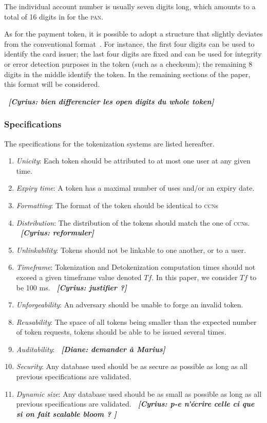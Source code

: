 \documentclass{llncs}
\newcommand{\cn}[1]{\emph{\bf \color{purple}~[Cyrius: #1]}}
\newcommand{\di}[1]{\emph{\bf \color{orange}~[Diane: #1]}}
\begin{document}
The individual account number is usually seven digits long, which amounts to a total of 16 digits in for the \textsc{pan}.

As for the payment token, it is possible to adopt a structure that slightly deviates from the conventional format~\cite{PCI-Guidelines}. For instance, the first four digits can be used to identify the card issuer; the last four digits are fixed and can be used for integrity or error detection purposes in the token (such as a checksum); the remaining 8 digits in the middle identify the token. In the remaining sections of the paper, this format will be considered.

\cn{bien differencier les open digits du whole token}

\subsubsection{Specifications}
The specifications for the tokenization systems are listed hereafter.
\begin{enumerate}
    \item \label{item-spec-disting} \textit{Unicity}: Each token should be attributed to at most one user at any given time.
    \item \textit{Expiry time}: A token has a maximal number of uses and/or an expiry date.
    \item \label{item-spec-format-ccn} \textit{Formatting}: The format of the token should be identical to \textsc{ccn}s 
    \item \textit{Distribution}: The distribution of the tokens should match the one of \textsc{ccn}s. \cn{reformuler}
    \item \label{item-spec-linkable} \textit{Unlinkability}: Tokens should not be linkable to one another, or to a user.
    \item \label{item-spec-time} \textit{Timeframe}: Tokenization and Detokenization computation times should not exceed a given timeframe value denoted $Tf$. In this paper, we consider $Tf$ to be 100 ms. \cn{justifier ?}
    \item \label{item-spec-unforgeability}\textit{Unforgeability}: An adversary should be unable to forge an invalid token.
    \item \label{item-sper-reusablilty}\textit{Reusability}: The space of all tokens being smaller than the expected number of token requests, tokens should be able to be issued several times.
    \item \textit{Auditability}: \di{demander à Marius}
    \item \textit{Security}: Any database used should be as secure as possible as long as all previous specifications are validated.
    \item \textit{Dynamic size}: Any database used should be as small as possible as long as all previous specifications are validated. \cn{p-e n'écrire celle ci que si on fait scalable bloom ? }
\end{enumerate}
\end{document}

